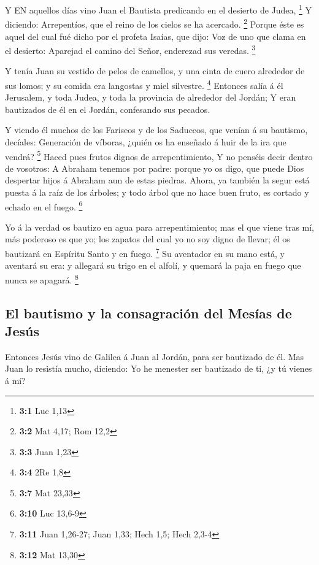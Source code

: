  Y EN aquellos días vino Juan el Bautista predicando en el
desierto de Judea, \footnote{\textbf{3:1} Luc 1,13}  Y
diciendo: Arrepentíos, que el reino de los cielos se ha acercado.
\footnote{\textbf{3:2} Mat 4,17; Rom 12,2}  Porque éste es
aquel del cual fué dicho por el profeta Isaías, que dijo: Voz de uno que
clama en el desierto: Aparejad el camino del Señor, enderezad sus
veredas. \footnote{\textbf{3:3} Juan 1,23}

 Y tenía Juan su vestido de pelos de camellos, y una cinta
de cuero alrededor de sus lomos; y su comida era langostas y miel
silvestre. \footnote{\textbf{3:4} 2Re 1,8}  Entonces salía á
él Jerusalem, y toda Judea, y toda la provincia de alrededor del Jordán;
 Y eran bautizados de él en el Jordán, confesando sus
pecados.

 Y viendo él muchos de los Fariseos y de los Saduceos, que
venían á su bautismo, decíales: Generación de víboras, ¿quién os ha
enseñado á huir de la ira que vendrá? \footnote{\textbf{3:7} Mat 23,33}
 Haced pues frutos dignos de arrepentimiento,  Y
no penséis decir dentro de vosotros: A Abraham tenemos por padre: porque
yo os digo, que puede Dios despertar hijos á Abraham aun de estas
piedras.  Ahora, ya también la segur está puesta á la raíz
de los árboles; y todo árbol que no hace buen fruto, es cortado y echado
en el fuego. \footnote{\textbf{3:10} Luc 13,6-9}

 Yo á la verdad os bautizo en agua para arrepentimiento;
mas el que viene tras mí, más poderoso es que yo; los zapatos del cual
yo no soy digno de llevar; él os bautizará en Espíritu Santo y en fuego.
\footnote{\textbf{3:11} Juan 1,26-27; Juan 1,33; Hech 1,5; Hech 2,3-4}
 Su aventador en su mano está, y aventará su era: y
allegará su trigo en el alfolí, y quemará la paja en fuego que nunca se
apagará. \footnote{\textbf{3:12} Mat 13,30}

\hypertarget{el-bautismo-y-la-consagraciuxf3n-del-mesuxedas-de-jesuxfas}{%
\subsection{El bautismo y la consagración del Mesías de
Jesús}\label{el-bautismo-y-la-consagraciuxf3n-del-mesuxedas-de-jesuxfas}}

 Entonces Jesús vino de Galilea á Juan al Jordán, para ser
bautizado de él.  Mas Juan lo resistía mucho, diciendo: Yo
he menester ser bautizado de ti, ¿y tú vienes á mí?

